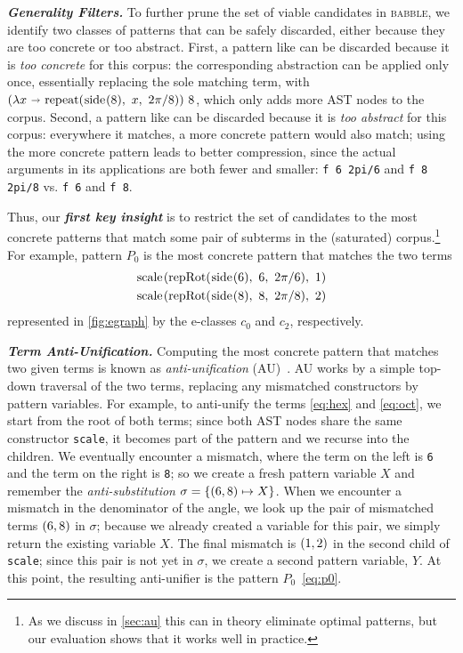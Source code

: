 \documentclass[acmsmall,screen,nonacm,review=false,timestamp=false]{acmart}
\newcommand{\emphbf}[1]{\emph{\textbf{#1}\xspace}}
\newcommand{\mypara}[1]{\smallskip\noindent\emphbf{#1.}\xspace}
\newcommand{\tname}[1]{\textsc{#1}\xspace}
\newcommand{\tool}{\tname{babble}}
\newcommand{\T}[1]{\mbox{\lstinline^#1^}}
\newcommand{\bnd}{\ \mathbf{\shortrightarrow}\ }
\begin{document}
\mypara{Generality Filters}
To further prune the set of viable candidates in \tool,
  we identify two classes of patterns that can be safely discarded,
  either because they are
  too concrete or too abstract.
First,
  a pattern like
can be discarded because it is
  \emph{too concrete} for this corpus:
  the corresponding abstraction
  can be applied only once,
  essentially replacing the sole matching term,
with
    $(\lambda x \bnd \rep{\pSide{8}}{x}{2\pi/8})\ 8$,
which only adds more AST nodes to the corpus. Second,
  a pattern like
can be discarded because
  it is \emph{too abstract} for this corpus:
  everywhere it matches,
  a more concrete pattern
would also match;
  using the more concrete pattern
  leads to better compression,
  since the actual arguments in its applications
  are both fewer and smaller:
    \T{f 6 2pi/6} and \T{f 8 2pi/8} vs.
    \T{f 6} and \T{f 8}.

Thus,
  our \emphbf{first key insight} is 
  to restrict the set of candidates
  to the most concrete patterns that match some pair
of subterms in the (saturated) corpus.\footnote{As we discuss in \autoref{sec:au} this can in theory eliminate optimal patterns,
  but our evaluation shows that it works well in practice.}
For example, pattern $P_0$
  is the most concrete pattern that matches the two terms
  \begin{gather}
    \scale{\repRot{\pSide{6}}{6}{2\pi/6}}{1}\label{eq:hex}\\
    \scale{\repRot{\pSide{8}}{8}{2\pi/8}}{2}\label{eq:oct}
\end{gather}
  represented in \autoref{fig:egraph} by the e-classes $c_0$ and $c_2$, respectively.


\mypara{Term Anti-Unification}
Computing the most concrete pattern that
  matches two given terms is known as
  \emph{anti-unification} (AU)~\cite{Reynolds1969TransformationalSA,plotkin1970lattice}.
AU works by
  a simple top-down traversal of the two terms,
  replacing any mismatched constructors by pattern variables.
For example,
  to anti-unify the terms \eqref{eq:hex} and \eqref{eq:oct},
  we start from the root of both terms;
  since both AST nodes share the same constructor \T{scale}, it becomes part of the pattern and we recurse into the children.
We eventually encounter a mismatch, where
  the term on the left is \T{6} and
  the term on the right is \T{8};
  so we create a fresh pattern variable $X$ and
  remember the \emph{anti-substitution}
  $\sigma = \{(\T{6}, \T{8}) \mapsto X\}$.
When we encounter a mismatch
  in the denominator of the angle,
  we look up the pair of mismatched terms
  $(\T{6}, \T{8})$ in $\sigma$;
  because we already created a variable for this pair,
  we simply return the existing variable $X$.
The final mismatch is $(\T{1}, \T{2})$
  in the second child of \T{scale}; since this pair is not yet in $\sigma$,
  we create a second pattern variable, $Y$.
At this point,
  the resulting anti-unifier is the pattern $P_0$~\eqref{eq:p0}.
\end{document}
